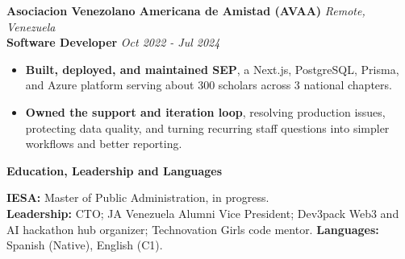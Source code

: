 \documentclass[10pt]{article}
\newcommand{\sectiontitle}[1]{%
    \vspace{3pt}
    \begin{center}
        \textbf{#1}
    \end{center}
    \vspace{-7pt}
}
\begin{document}
\vspace{2pt}
\textbf{Asociacion Venezolano Americana de Amistad (AVAA)} \hfill \textit{Remote, Venezuela} \\
\textbf{Software Developer} \hfill \textit{Oct 2022 - Jul 2024}
\begin{itemize}
    \item \textbf{Built, deployed, and maintained SEP}, a Next.js, PostgreSQL, Prisma, and Azure platform serving about 300 scholars across 3 national chapters.
    \item \textbf{Owned the support and iteration loop}, resolving production issues, protecting data quality, and turning recurring staff questions into simpler workflows and better reporting.
\end{itemize}

\sectiontitle{Education, Leadership and Languages}
\textbf{IESA:} Master of Public Administration, in progress. \\
\textbf{Leadership:} CTO; JA Venezuela Alumni Vice President; Dev3pack Web3 and AI hackathon hub organizer; Technovation Girls code mentor. \textbf{Languages:} Spanish (Native), English (C1).
\end{document}
